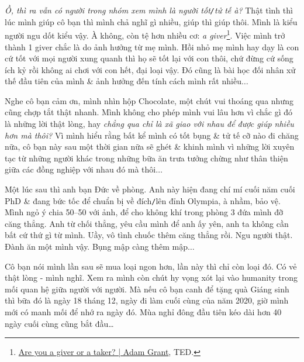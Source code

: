 \documentclass[12pt,oneside]{book}
\begin{document}
{\it Ồ, thì ra vẫn có người trong nhóm xem mình là người tốt{\tt/}tử tế à?} Thật tình thì lúc mình giúp cô bạn thì mình chả nghĩ gì nhiều, giúp thì giúp thôi. Mình là kiểu người ngu dốt kiểu vậy. À không, còn tệ hơn nhiều cơ: {\it a giver}\footnote{\href{https://www.youtube.com/watch?v=YyXRYgjQXX0}{Are you a giver or a taker? | Adam Grant}, TED.}. Việc mình trở thành 1 giver chắc là do ảnh hưởng từ mẹ mình. Hồi nhỏ mẹ mình hay dạy là con cứ tốt với mọi người xung quanh thì họ sẽ tốt lại với con thôi, chứ đừng cứ sống ích kỷ rồi không ai chơi với con hết, đại loại vậy. Đó cũng là bài học đối nhân xử thế đầu tiên của mình \& ảnh hưởng đến tính cách mình rất nhiều$\ldots$

Nghe cô bạn cảm ơn, mình nhìn hộp Chocolate, một chút vui thoáng qua nhưng cũng chợp tắt thật nhanh. Mình không cho phép mình vui lâu hơn vì chắc gì đó là những lời thật lòng, hay {\it chẳng qua chỉ là xã giao với nhau để được giúp nhiều hơn mà thôi?} Vì mình hiểu rằng bất kể mình có tốt bụng \& tử tế cỡ nào đi chăng nữa, cô bạn này sau một thời gian nữa sẽ ghét \& khinh mình vì những lời xuyên tạc từ những người khác trong những bữa ăn trưa tưởng chừng như thân thiện giữa các đồng nghiệp với nhau đó mà thôi$\ldots$

Một lúc sau thì anh bạn Đức về phòng. Anh này hiện đang chí mí cuối năm cuối PhD \& đang bức tốc để chuẩn bị về đích{\tt/}lên đỉnh Olympia, à nhầm, bảo vệ. Mình ngỏ ý chia 50--50 với ảnh, để cho không khí trong phòng 3 đứa mình đỡ căng thẳng. Anh từ chối thẳng, yêu cầu mình để anh ấy yên, anh ta không cần bất cứ thứ gì từ mình. Uầy, vô tình chuốc thêm căng thẳng rồi. Ngu người thật. Đành ăn một mình vậy. Bụng mập càng thêm mập$\ldots$

Cô bạn nói mình lần sau sẽ mua loại ngon hơn, lần này thì chỉ còn loại đó. Có vẻ thật lòng - mình nghĩ. Xem ra mình còn chút hy vọng xót lại vào humanity trong mối quan hệ giữa người với người. Mà nếu cô bạn canh để tặng quà Giáng sinh thì bữa đó là ngày 18 tháng 12, ngày đi làm cuối cùng của năm 2020, giờ mình mới có manh mối để nhớ ra ngày đó. Mùa nghỉ đông đầu tiên kéo dài hơn 40 ngày cuối cùng cũng bắt đầu\ldots
\end{document}

